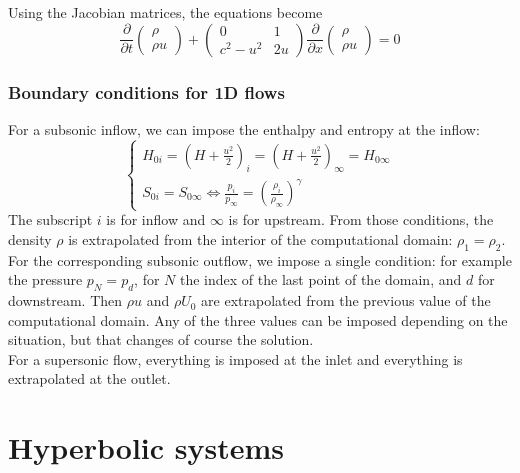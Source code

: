 \documentclass[12pt, openany]{report}
\theoremstyle{definition}
\begin{document}
Using the Jacobian matrices, the equations become
\begin{equation}
	\frac{\partial}{\partial t}\begin{pmatrix}
		\rho\\ \rho u
	\end{pmatrix} + \begin{pmatrix}
		0 & 1 \\ c^2-u^2 & 2u
	\end{pmatrix} \frac{\partial }{\partial x}\begin{pmatrix}
		\rho\\ \rho u
	\end{pmatrix} = 0
\end{equation}
\subsection{Boundary conditions for 1D flows}
For a subsonic inflow, we can impose the enthalpy and entropy at the inflow: 
\begin{equation}
	\begin{cases}
		H_{0i} = \left(H+\frac{u^2}{2}\right)_i = \left(H+\frac{u^2}{2}\right)_{\infty} = H_{0\infty} \\
		S_{0i} = S_{0\infty} \Longleftrightarrow \frac{p_i}{p_\infty} = \left(\frac{\rho_i}{\rho_\infty}\right)^\gamma 
	\end{cases}
\end{equation}
The subscript $i$ is for inflow and $\infty$ is for upstream. From those conditions, the density $\rho$ is extrapolated from the interior of the computational domain: $\rho_1=\rho_2$.\\

For the corresponding subsonic outflow, we impose a single condition: for example the pressure $p_N=p_d$, for $N$ the index of the last point of the domain, and $d$ for downstream. Then $\rho u$ and $\rho U_0$ are extrapolated from the previous value of the computational domain. Any of the three values can be imposed depending on the situation, but that changes of course the solution. \\

For a supersonic flow, everything is imposed at the inlet and everything is extrapolated at the outlet. 
\chapter{Hyperbolic systems}
\end{document}
